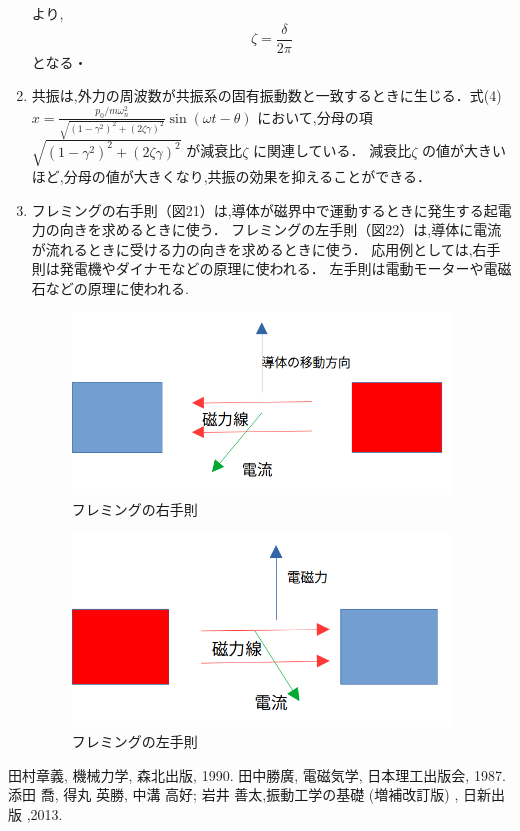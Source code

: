 \documentclass[a4paper,10.5pt]{jsarticle}
\begin{document}
\begin{enumerate}
  より,
  \begin{equation}
    \zeta = {\dfrac{\delta}{{2\pi}}}
  \end{equation}
  となる・
  \item 共振は,外力の周波数が共振系の固有振動数と一致するときに生じる．式(4)
    $x = \frac{{p_0/m\omega_n^2}}{{\sqrt{{(1-\gamma^2)^2+(2\zeta\gamma)^2}}}}\sin(\omega{t}-\theta)$
  において,分母の項 $\sqrt{{(1-\gamma^2)^2+(2\zeta\gamma)^2}} $
  が減衰比$\zeta$ に関連している．
  減衰比$\zeta$ の値が大きいほど,分母の値が大きくなり,共振の効果を抑えることができる．
  \item 
  フレミングの右手則（図21）は,導体が磁界中で運動するときに発生する起電力の向きを求めるときに使う．
  フレミングの左手則（図22）は,導体に電流が流れるときに受ける力の向きを求めるときに使う．
  応用例としては,右手則は発電機やダイナモなどの原理に使われる．
  左手則は電動モーターや電磁石などの原理に使われる. 
  \newpage
  \begin{figure}[h]
    \centering
    \includegraphics[width=10cm]{12.png}
    \caption{フレミングの右手則}
  \end{figure}
  \begin{figure}[h]
    \centering
    \includegraphics[width=10cm]{13.png}
    \caption{フレミングの左手則}
  \end{figure}
\end{enumerate}

\begin{thebibliography}{20}
  \bibitem{} 
  田村章義, 機械力学, 森北出版, 1990.
  \bibitem{}
  田中勝廣, 電磁気学, 日本理工出版会, 1987.
  \bibitem{}
  添田 喬, 得丸 英勝, 中溝 高好; 岩井 善太,振動工学の基礎 (増補改訂版)  , 日新出版 ,2013. 
 \end{thebibliography}
\end{document}

